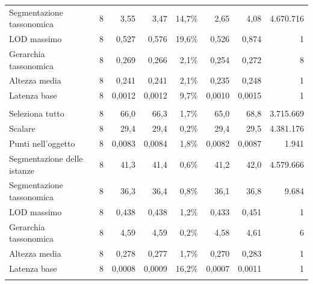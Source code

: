 \begin{small}
\begin{longtable}{lrrrrrr r}
\quad Segmentazione tassonomica & 8 & 3,55 & 3,47 & 14,7\% & 2,65 & 4,08 & 4.670.716 \\
\quad LOD massimo & 8 & 0,527 & 0,576 & 19,6\% & 0,526 & 0,874 & 1 \\
\quad Gerarchia tassonomica & 8 & 0,269 & 0,266 & 2,1\% & 0,254 & 0,272 & 8 \\
\quad Altezza media & 8 & 0,241 & 0,241 & 2,1\% & 0,235 & 0,248 & 1 \\
\quad Latenza base & 8 & 0,0012 & 0,0012 & 9,7\% & 0,0010 & 0,0015 & 1 \\
\addlinespace
\multicolumn{8}{l}{\textbf{Virtuoso}}\\
\quad Seleziona tutto & 8 & 66,0 & 66,3 & 1,7\% & 65,0 & 68,8 & 3.715.669 \\
\quad Scalare & 8 & 29,4 & 29,4 & 0,2\% & 29,4 & 29,5 & 4.381.176 \\
\quad Punti nell'oggetto & 8 & 0,0083 & 0,0084 & 1,8\% & 0,0082 & 0,0087 & 1.941 \\
\quad Segmentazione delle istanze & 8 & 41,3 & 41,4 & 0,6\% & 41,2 & 42,0 & 4.579.666 \\
\quad Segmentazione tassonomica & 8 & 36,3 & 36,4 & 0,8\% & 36,1 & 36,8 & 9.684 \\
\quad LOD massimo & 8 & 0,438 & 0,438 & 1,2\% & 0,433 & 0,451 & 1 \\
\quad Gerarchia tassonomica & 8 & 4,59 & 4,59 & 0,2\% & 4,58 & 4,61 & 6 \\
\quad Altezza media & 8 & 0,278 & 0,277 & 1,7\% & 0,270 & 0,283 & 1 \\
\quad Latenza base & 8 & 0,0008 & 0,0009 & 16,2\% & 0,0007 & 0,0011 & 1 \\
\addlinespace
\end{longtable}
\end{small}

